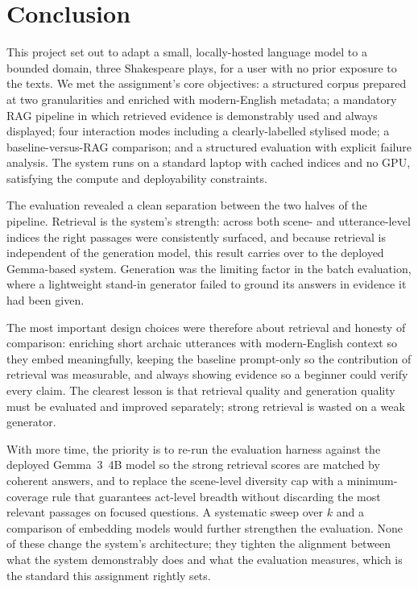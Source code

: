\section{Conclusion}
\label{sec:conclusion}

This project set out to adapt a small, locally-hosted language model to a
bounded domain, three Shakespeare plays, for a user with no prior
exposure to the texts. We met the assignment's core objectives: a
structured corpus prepared at two granularities and enriched with
modern-English metadata; a mandatory RAG pipeline in which retrieved
evidence is demonstrably used and always displayed; four interaction
modes including a clearly-labelled stylised mode; a baseline-versus-RAG
comparison; and a structured evaluation with explicit failure analysis.
The system runs on a standard laptop with cached indices and no GPU,
satisfying the compute and deployability constraints.

The evaluation revealed a clean separation between the two halves of the
pipeline. Retrieval is the system's strength: across both scene- and
utterance-level indices the right passages were consistently surfaced,
and because retrieval is independent of the generation model, this result
carries over to the deployed Gemma-based system. Generation was the
limiting factor in the batch evaluation, where a lightweight stand-in
generator failed to ground its answers in evidence it had been given.

The most important design choices were therefore about retrieval and
honesty of comparison: enriching short archaic utterances with
modern-English context so they embed meaningfully, keeping the baseline
prompt-only so the contribution of retrieval was measurable, and always
showing evidence so a beginner could verify every claim. The clearest
lesson is that retrieval quality and generation quality must be evaluated
and improved separately; strong retrieval is wasted on a weak generator.

With more time, the priority is to re-run the evaluation harness against
the deployed Gemma~3~4B model so the strong retrieval scores are matched
by coherent answers, and to replace the scene-level diversity cap with a
minimum-coverage rule that guarantees act-level breadth without discarding
the most relevant passages on focused questions. A systematic sweep over
$k$ and a comparison of embedding models would further strengthen the
evaluation. None of these change the system's architecture; they tighten
the alignment between what the system demonstrably does and what the
evaluation measures, which is the standard this assignment rightly sets.
